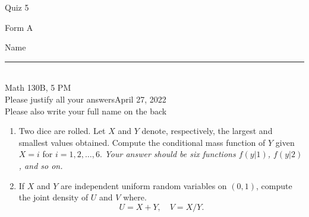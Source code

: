 \documentclass[12pt]{article}
\begin{document}
\begin{flushleft} 
\centerline{\LARGE{Quiz 5}} 
\vspace{5 mm}
{Form A}\hfill  
{Name \rule {2 in}{0.01in}}\\
Math 130B, 5 PM
\\
{Please justify all your answers}\hfill {April 27, 2022}
\\
{Please also write your full name on the back} 

\medskip
\end{flushleft}

\begin{enumerate}
	\item Two dice are rolled. Let $X$ and $Y$ denote, respectively, the largest and smallest values obtained. Compute the conditional mass function of $Y$ given $X=i$ for $i=1,2, \ldots, 6$. \textit{Your answer should be six functions $f(y|1)$, $f(y|2)$, and so on.}

	\vfill

	\item If $X$ and $Y$ are independent uniform random variables on $(0,1)$, compute the joint density of $U$ and $V$ where.
	\[
		U = X+Y,\quad V = X/Y.
	\]
	\vfill
\end{enumerate}
\end{document}
